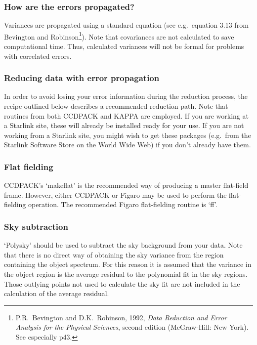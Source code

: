 \documentclass[11pt,twoside]{article}
\newcommand{\htmladdnormallink}[2]{#1}
\begin{document}
\subsubsection{How are the errors propagated?}

Variances are propagated using a standard equation (see e.g.\ equation 3.13
from Bevington and Robinson\footnote{P.R.~Bevington and D.K.~Robinson,
1992, {\it Data Reduction and Error Analysis for the Physical Sciences},
second edition (McGraw-Hill: New York).  See especially p43.}).
Note that covariances are not calculated to save computational time.  Thus,
calculated variances will not be formal for problems with correlated errors.

\subsubsection{Reducing data with error propagation}

In order to avoid losing your error information during the reduction
process, the recipe outlined below describes a recommended reduction
path. Note that routines from both CCDPACK and KAPPA are employed. If you
are working at a Starlink site, these will already be installed ready for
your use.  If you are not working from a Starlink site, you might wish to
get these packages (e.g.\ from the
\htmladdnormallink{Starlink Software Store}
{http://www.starlink.ac.uk/cgi-store/storetop}
on the World Wide Web) if you don't already have them.

\subsubsection{Flat fielding}

CCDPACK's `makeflat' is the recommended way of producing a master
flat-field frame.
However, either CCDPACK or Figaro may be used to perform the
flat-fielding operation.
The recommended Figaro flat-fielding routine is `ff'.

\subsubsection{Sky subtraction}

`Polysky' should be used to subtract the sky background from your data. Note
that there is no direct way of obtaining the sky variance from the region
containing the object spectrum. For this reason it is assumed that the
variance in the object region is the average residual to the polynomial
fit in the sky regions. Those outlying points not used to calculate the
sky fit are not included in the calculation of the average residual.
\end{document}
